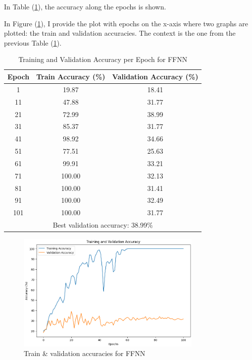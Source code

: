 \documentclass[11pt]{scrartcl}
\begin{document}
In Table (\ref{tab:task1-accuracy}),
the accuracy along the epochs is shown.

In Figure (\ref{fig:task1-accuracy}), 
I provide the plot with epochs on the x-axis where two graphs are plotted:
the train and validation accuracies.
The context is the one from the previous Table (\ref{tab:task1-accuracy}). 


\begin{table}[htbp]
\centering
\caption{Training and Validation Accuracy per Epoch for FFNN}
\begin{tabular}{ccc}
\toprule
\textbf{Epoch} & \textbf{Train Accuracy (\%)} & \textbf{Validation Accuracy (\%)} \\
\midrule
1    & 19.87  & 18.41  \\
11   & 47.88  & 31.77  \\
21   & 72.99  & 38.99  \\
31   & 85.37  & 31.77  \\
41   & 98.92  & 34.66  \\
51   & 77.51  & 25.63  \\
61   & 99.91  & 33.21  \\
71   & 100.00 & 32.13  \\
81   & 100.00 & 31.41  \\
91   & 100.00 & 32.49  \\
101  & 100.00 & 31.77  \\
\midrule
\multicolumn{3}{c}{Best validation accuracy: 38.99\%} \\
\bottomrule
\end{tabular}
\label{tab:task1-accuracy}
\end{table}

\begin{figure}[htbp]
\centering
\includegraphics[width=0.8\textwidth]{./figures/task1-accuracy.png}
\caption{Train \& validation accuracies for FFNN}
\label{fig:task1-accuracy}
\end{figure}
\end{document}
